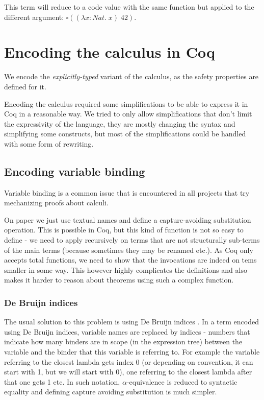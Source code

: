 \documentclass[runningheads]{article}
\begin{document}
This term will reduce to a code value with the same function but applied to the different argument: $\square((\lambda x: Nat. \; x) \; 42)$.

\section{Encoding the calculus in Coq}
We encode the \textit{explicitly-typed} variant of the calculus, as the safety properties are defined for it.

Encoding the calculus required some simplifications to be able to express it in Coq in a reasonable way. We tried to only allow simplifications that don't limit the expressivity of the language, they are mostly changing the syntax and simplifying some constructs, but most of the simplifications could be handled with some form of rewriting.

\subsection{Encoding variable binding}

Variable binding is a common issue that is encountered in all projects that try mechanizing proofs about calculi. 

On paper we just use textual names and define a capture-avoiding substitution operation. This is possible in Coq, but this kind of function is not so easy to define - we need to apply recursively on terms that are not structurally sub-terms of the main terms (because sometimes they may be renamed etc.). As Coq only accepts total functions, we need to show that the invocations are indeed on tems smaller in some way. This however highly complicates the definitions and also makes it harder to reason about theorems using such a complex function.

\subsubsection{De Bruijn indices}

The usual solution to this problem is using De Bruijn indices \cite{Bruijn1972LambdaCN}. In a term encoded using De Bruijn indices, variable names are replaced by indices - numbers that indicate how many binders are in scope (in the expression tree) between the variable and the binder that this variable is referring to. For example the variable referring to the closest lambda gets index 0 (or depending on convention, it can start with 1, but we will start with 0), one referring to the closest lambda after that one gets 1 etc. In such notation, $\alpha$-equivalence is reduced to syntactic equality and defining capture avoiding substitution is much simpler.
\end{document}
